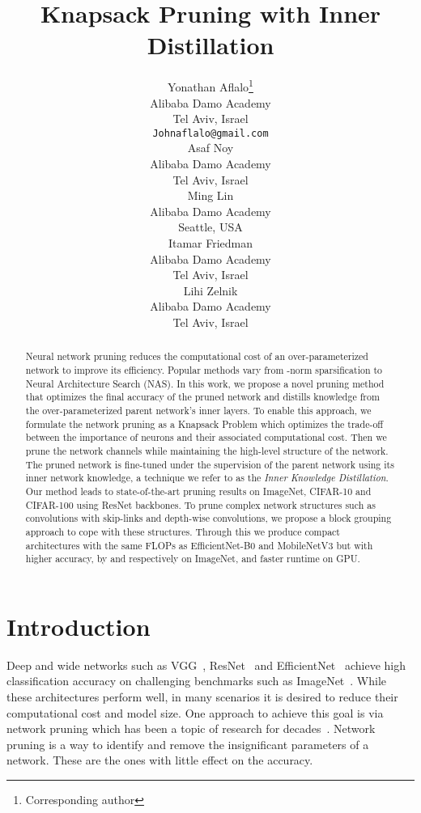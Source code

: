 \documentclass{article}
\title{Knapsack Pruning with Inner Distillation}
\author{Yonathan Aflalo\thanks{Corresponding author} \\
  Alibaba Damo Academy\\
  Tel Aviv, Israel \\
  \texttt{Johnaflalo@gmail.com} \\
  \And
  Asaf Noy \\
  Alibaba Damo Academy\\
  Tel Aviv, Israel \\
  \And
  Ming Lin \\
  Alibaba Damo Academy\\
  Seattle, USA \\
  \And
  Itamar Friedman \\
  Alibaba Damo Academy\\
  Tel Aviv, Israel \\
  \And
  Lihi Zelnik \\
  Alibaba Damo Academy\\
  Tel Aviv, Israel \\
}
\begin{document}
\maketitle



\begin{abstract}
Neural network pruning reduces the computational cost of an over-parameterized network to improve its efficiency. Popular methods vary from -norm sparsification to Neural Architecture Search (NAS).  In this work, we propose a novel pruning method that optimizes the final accuracy of the pruned network and distills knowledge from the over-parameterized parent network's inner layers. To enable this approach, we formulate the network pruning as a Knapsack Problem which optimizes the trade-off between the importance of neurons and their associated computational cost. Then we prune the network channels while maintaining the high-level structure of the network. The pruned network is fine-tuned under the supervision of the parent network using its inner network knowledge, a technique we refer to as the {\it Inner Knowledge Distillation}. Our method leads to state-of-the-art pruning results on ImageNet, CIFAR-10 and CIFAR-100 using ResNet backbones. 
To prune complex network structures such as convolutions with skip-links and depth-wise convolutions, we propose a block grouping approach to cope with these structures.
Through this we produce compact architectures with the same FLOPs as EfficientNet-B0 and MobileNetV3 but with higher accuracy, by  and  respectively on ImageNet, and faster runtime on GPU.



\end{abstract}
\section{Introduction}


Deep and wide networks such as VGG~\cite{VGG}, ResNet~\cite{ResNet} and EfficientNet~\cite{EfficientNet}  achieve high classification accuracy on challenging benchmarks such as ImageNet~\cite{imagenet_cvpr09}. 
While these architectures perform well, in many scenarios it is desired to reduce their computational cost and model size.
One approach to achieve this goal is via network pruning which has been a topic of research for decades~\cite{braindamage}.
Network pruning is a way to identify and remove the insignificant parameters of a network.
These are the ones with little effect on the accuracy.
\end{document}

